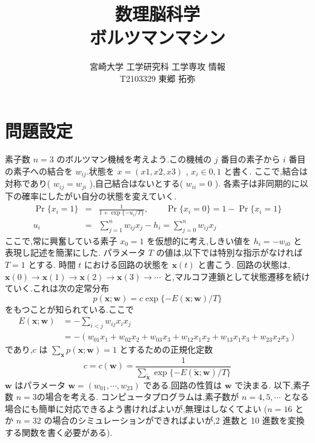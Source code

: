\documentclass[a4j, uplatex, fleqn, dvipdfmx]{jsarticle} %
\title{\vspace{-1.5cm}数理脳科学\\ボルツマンマシン}
\author{宮崎大学 工学研究科 工学専攻 情報\\T2103329 東郷 拓弥}
\begin{document}
\maketitle
\section{問題設定}
素子数 $n = 3$ のボルツマン機械を考えよう.この機械の $j$ 番目の素子から $i$ 番目の素子への結合を
 $w_{ij}$.状態を $x = (x1, x2,x3)$ , $x_i \in {0, 1}$ と書く. 
ここで,結合は対称であり( $w_{ij} = w_{ji}$ ),自己結合はないとする( $w_{ii} = 0$ ).
各素子は非同期的に以下の確率にしたがい自分の状態を変えていく.
\begin{eqnarray}
  \label{eq:excitement_dynamics}
  \operatorname{Pr}\{x_i = 1\} & = & \frac{1}{1 + \exp \{-u_i / T\}}, \qquad \operatorname{Pr}\{x_i = 0\} = 1 - \operatorname{Pr}\{x_i = 1\} \\
  u_i & = & \sum_{j=1}^n w_{ij} x_j - h_i = \sum_{j=0}^n w_{ij} x_j
\end{eqnarray}
ここで,常に興奮している素子 $x_0 = 1$ を仮想的に考え,しきい値を $h_i = −w_{i0}$ と表現し記述を簡潔にした.
パラメータ $T$ の値は,以下では特別な指示がなければ $T = 1$ とする.
時間 $t$ における回路の状態を $\bm{x}(t)$ と書こう. 回路の状態は,
$ \bm{x}(0) \rightarrow \bm{x}(1) \rightarrow \bm{x}(2) \rightarrow \bm{x}(3) \rightarrow \cdots $
と,マルコフ連鎖として状態遷移を続けていく.これは次の定常分布
\begin{equation}
  \label{eq:stationary_distribution}
  p(\bm{x} ; \bm{w}) = c \exp \{-E(\bm{x} ; \bm{w}) / T\}
\end{equation}
をもつことが知られている.ここで
\begin{equation}
  \begin{aligned}
    E(\bm{x} ; \bm{w}) &=-\sum_{i<j} w_{i j} x_{i} x_{j} \\
    &=-\left(w_{01} x_{1}+w_{02} x_{2}+w_{03} x_{3}+w_{12} x_{1} x_{2}+w_{13} x_{1} x_{3}+w_{23} x_{2} x_{3}\right)
  \end{aligned}
\end{equation}
であり,$c$ は $\sum_{\bm{x}} p(\bm{x}; \bm{w}) = 1$ とするための正規化定数
\begin{equation}
  c = c(\bm{w}) = \frac{1}{\sum_{\tilde{\bm{x}}} \exp \{-E(\tilde{\bm{x}} ; \bm{w}) / T\}}
\end{equation}
$\bm{w}$ はパラメータ $\bm{w} = (w_{01}, \cdots , w_{23})$ である.回路の性質は $\bm{w}$ で決まる.
以下,素子数 $n = 3$の場合を考える.
コンピュータプログラムは,素子数が $n = 4, 5, \cdots$ となる場合にも簡単に対応できるよう書ければよいが,無理はしなくてよい
($n = 16$ とか $n = 32$ の場合のシミュレーションができればよいが,2 進数と 10 進数を変換する関数を書く必要がある).
\end{document}

